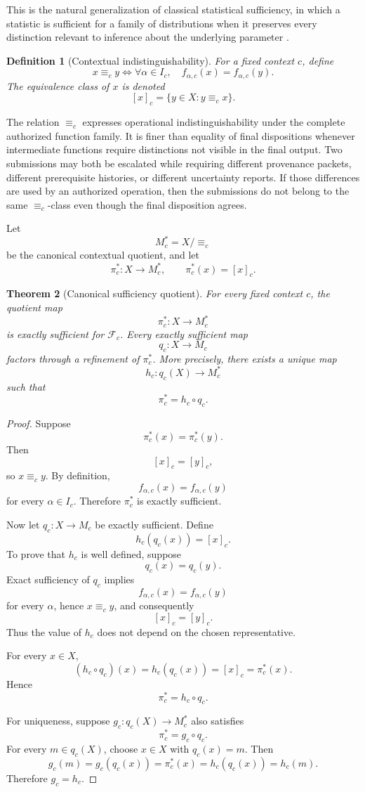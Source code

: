 \documentclass[11pt]{article}
\newtheorem{definition}{Definition}[section]
\newtheorem{theorem}[definition]{Theorem}
\theoremstyle{definition}
\newcommand{\F}{\mathcal{F}}
\begin{document}
This is the natural generalization of classical statistical sufficiency, in which a statistic is sufficient for a family of distributions when it preserves every distinction relevant to inference about the underlying parameter \cite{fisher1922,neyman1935,halmos1949,lehmann1998}.

\begin{definition}[Contextual indistinguishability]
For a fixed context \(c\), define
\[
x\equiv_c y
\iff
\forall \alpha\in I_c,
\quad
f_{\alpha,c}(x)=f_{\alpha,c}(y).
\]
The equivalence class of \(x\) is denoted
\[
[x]_c
=
\{y\in X:y\equiv_c x\}.
\]
\end{definition}

The relation \(\equiv_c\) expresses operational indistinguishability under the complete authorized function family. It is finer than equality of final dispositions whenever intermediate functions require distinctions not visible in the final output. Two submissions may both be escalated while requiring different provenance packets, different prerequisite histories, or different uncertainty reports. If those differences are used by an authorized operation, then the submissions do not belong to the same \(\equiv_c\)-class even though the final disposition agrees.

Let
\[
M_c^{*}
=
X/{\equiv_c}
\]
be the canonical contextual quotient, and let
\[
\pi_c^{*}:X\to M_c^{*},
\qquad
\pi_c^{*}(x)=[x]_c.
\]

\begin{theorem}[Canonical sufficiency quotient]
For every fixed context \(c\), the quotient map
\[
\pi_c^{*}:X\to M_c^{*}
\]
is exactly sufficient for \(\F_c\). Every exactly sufficient map
\[
q_c:X\to M_c
\]
factors through a refinement of \(\pi_c^{*}\). More precisely, there exists a unique map
\[
h_c:q_c(X)\to M_c^{*}
\]
such that
\[
\pi_c^{*}
=
h_c\circ q_c.
\]
\end{theorem}

\begin{proof}
Suppose
\[
\pi_c^{*}(x)=\pi_c^{*}(y).
\]
Then
\[
[x]_c=[y]_c,
\]
so \(x\equiv_c y\). By definition,
\[
f_{\alpha,c}(x)=f_{\alpha,c}(y)
\]
for every \(\alpha\in I_c\). Therefore \(\pi_c^{*}\) is exactly sufficient.

Now let \(q_c:X\to M_c\) be exactly sufficient. Define
\[
h_c(q_c(x))
=
[x]_c.
\]
To prove that \(h_c\) is well defined, suppose
\[
q_c(x)=q_c(y).
\]
Exact sufficiency of \(q_c\) implies
\[
f_{\alpha,c}(x)=f_{\alpha,c}(y)
\]
for every \(\alpha\), hence \(x\equiv_c y\), and consequently
\[
[x]_c=[y]_c.
\]
Thus the value of \(h_c\) does not depend on the chosen representative.

For every \(x\in X\),
\[
(h_c\circ q_c)(x)
=
h_c(q_c(x))
=
[x]_c
=
\pi_c^{*}(x).
\]
Hence
\[
\pi_c^{*}=h_c\circ q_c.
\]

For uniqueness, suppose \(g_c:q_c(X)\to M_c^{*}\) also satisfies
\[
\pi_c^{*}=g_c\circ q_c.
\]
For every \(m\in q_c(X)\), choose \(x\in X\) with \(q_c(x)=m\). Then
\[
g_c(m)
=
g_c(q_c(x))
=
\pi_c^{*}(x)
=
h_c(q_c(x))
=
h_c(m).
\]
Therefore \(g_c=h_c\).
\end{proof}
\end{document}
